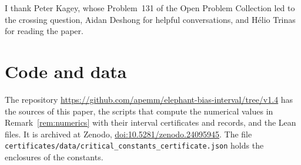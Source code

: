 \documentclass[EJP,preprint]{ejpecp}
\begin{document}
\raggedbottom






\medskip
\begin{acks}
I thank Peter Kagey, whose Problem~131 of the Open Problem Collection
\cite{kagey131} led to the crossing question, Aidan Deshong for
helpful conversations, and H\'elio Trinas for reading the paper.
\end{acks}

\section*{Code and data}
The repository
\url{https://github.com/apemm/elephant-bias-interval/tree/v1.4}
has the sources of this paper, the scripts that compute the numerical
values in Remark~\ref{rem:numerics} with their interval certificates
and records, and the Lean files. It is archived at Zenodo,
\href{https://doi.org/10.5281/zenodo.24095945}{doi:10.5281/zenodo.24095945}. The file
\nolinkurl{certificates/data/critical_constants_certificate.json}
holds the enclosures of the constants.

\appendix





\end{document}
